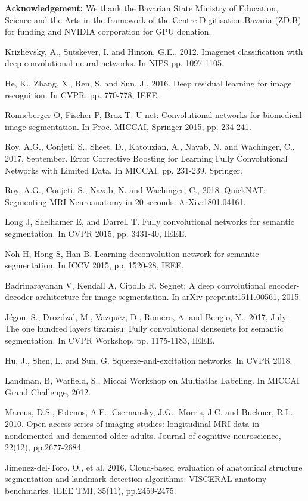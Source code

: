\documentclass{llncs}
\begin{document}
\noindent
\textbf{Acknowledgement:} We thank the Bavarian State Ministry of Education, Science and the Arts in the framework of the Centre Digitisation.Bavaria (ZD.B) for funding and NVIDIA corporation for GPU donation.

\vspace{-2mm}
\begin{thebibliography}{16}
\vspace{-2mm}

Krizhevsky, A., Sutskever, I. and Hinton, G.E., 2012. Imagenet classification with deep convolutional neural networks. In NIPS pp. 1097-1105.

He, K., Zhang, X., Ren, S. and Sun, J., 2016. Deep residual learning for image recognition. In CVPR, pp. 770-778, IEEE.

Ronneberger O, Fischer P, Brox T. U-net: Convolutional networks for biomedical image segmentation. In Proc. MICCAI, Springer 2015,  pp. 234-241.

Roy, A.G., Conjeti, S., Sheet, D., Katouzian, A., Navab, N. and Wachinger, C., 2017, September. Error Corrective Boosting for Learning Fully Convolutional Networks with Limited Data. In MICCAI, pp. 231-239, Springer.

Roy, A.G., Conjeti, S., Navab, N. and Wachinger, C., 2018. QuickNAT: Segmenting MRI Neuroanatomy in 20 seconds. ArXiv:1801.04161.

Long J, Shelhamer E, and Darrell T. Fully convolutional networks for semantic segmentation. In CVPR 2015, pp. 3431-40, IEEE.

Noh H, Hong S, Han B. Learning deconvolution network for semantic segmentation. In ICCV 2015, pp. 1520-28, IEEE.

Badrinarayanan V, Kendall A, Cipolla R. Segnet: A deep convolutional encoder-decoder architecture for image segmentation. In arXiv preprint:1511.00561, 2015.

J\'{e}gou, S., Drozdzal, M., Vazquez, D., Romero, A. and Bengio, Y., 2017, July. The one hundred layers tiramisu: Fully convolutional densenets for semantic segmentation. In CVPR Workshop, pp. 1175-1183, IEEE.

Hu, J., Shen, L. and Sun, G. Squeeze-and-excitation networks. In CVPR 2018.

Landman, B, Warfield, S., Miccai Workshop on Multiatlas
Labeling. In MICCAI Grand Challenge, 2012.

Marcus, D.S., Fotenos, A.F., Csernansky, J.G., Morris, J.C. and Buckner, R.L., 2010. Open access series of imaging studies: longitudinal MRI data in nondemented and demented older adults. Journal of cognitive neuroscience, 22(12), pp.2677-2684.

Jimenez-del-Toro, O., et al. 2016. Cloud-based evaluation of anatomical structure segmentation and landmark detection algorithms: VISCERAL anatomy benchmarks. IEEE TMI, 35(11), pp.2459-2475.

\end{thebibliography}
\end{document}
